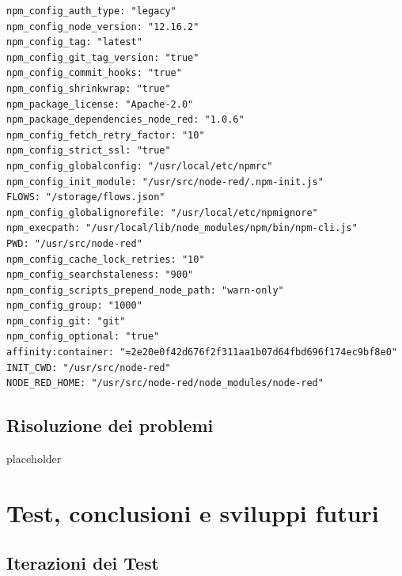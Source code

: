 \documentclass[a4paper,10pt]{memoir}
\begin{document}
\begin{lstlisting}
npm_config_auth_type: "legacy"
npm_config_node_version: "12.16.2"
npm_config_tag: "latest"
npm_config_git_tag_version: "true"
npm_config_commit_hooks: "true"
npm_config_shrinkwrap: "true"
npm_package_license: "Apache-2.0"
npm_package_dependencies_node_red: "1.0.6"
npm_config_fetch_retry_factor: "10"
npm_config_strict_ssl: "true"
npm_config_globalconfig: "/usr/local/etc/npmrc"
npm_config_init_module: "/usr/src/node-red/.npm-init.js"
FLOWS: "/storage/flows.json"
npm_config_globalignorefile: "/usr/local/etc/npmignore"
npm_execpath: "/usr/local/lib/node_modules/npm/bin/npm-cli.js"
PWD: "/usr/src/node-red"
npm_config_cache_lock_retries: "10"
npm_config_searchstaleness: "900"
npm_config_scripts_prepend_node_path: "warn-only"
npm_config_group: "1000"
npm_config_git: "git"
npm_config_optional: "true"
affinity:container: "=2e20e0f42d676f2f311aa1b07d64fbd696f174ec9bf8e0"
INIT_CWD: "/usr/src/node-red"
NODE_RED_HOME: "/usr/src/node-red/node_modules/node-red"
\end{lstlisting}

\clearpage

\section{Risoluzione dei problemi}

placeholder

\clearpage


\chapter{Test, conclusioni e sviluppi futuri}

\section{Iterazioni dei Test}
\end{document}
